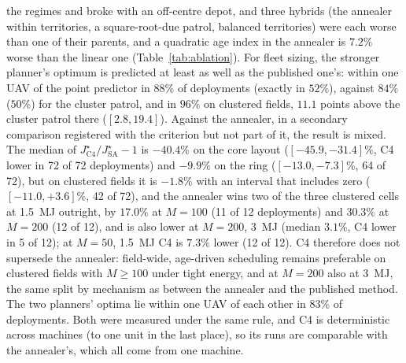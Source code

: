 \documentclass[journal,outdir=./]{IEEEtran}
\begin{document}
the regimes and broke with an off-centre depot, and three hybrids (the annealer within territories, a square-root-due patrol, balanced territories) were each worse than one of their parents, and a quadratic age index in the annealer is $7.2\%$ worse than the linear one (Table~\ref{tab:ablation}). For fleet sizing, the stronger planner's optimum is predicted at least as well as the published one's: within one UAV of the point predictor in $88\%$ of deployments (exactly in $52\%$), against $84\%$ ($50\%$) for the cluster patrol, and in $96\%$ on clustered fields, $11.1$ points above the cluster patrol there ($[2.8,19.4]$). Against the annealer, in a secondary comparison registered with the criterion but not part of it, the result is mixed. The median of $J^{\star}_{\mathrm{C4}}/J^{\star}_{\mathrm{SA}}-1$ is $-40.4\%$ on the core layout ($[-45.9,-31.4]\%$, C4 lower in 72 of 72 deployments) and $-9.9\%$ on the ring ($[-13.0,-7.3]\%$, 64 of 72), but on clustered fields it is $-1.8\%$ with an interval that includes zero ($[-11.0,+3.6]\%$, 42 of 72), and the annealer wins two of the three clustered cells at 1.5~MJ outright, by $17.0\%$ at $M=100$ (11 of 12 deployments) and $30.3\%$ at $M=200$ (12 of 12), and is also lower at $M=200$, 3~MJ (median $3.1\%$, C4 lower in 5 of 12); at $M=50$, 1.5~MJ C4 is $7.3\%$ lower (12 of 12). C4 therefore does not supersede the annealer: field-wide, age-driven scheduling remains preferable on clustered fields with $M\ge100$ under tight energy, and at $M=200$ also at 3~MJ, the same split by mechanism as between the annealer and the published method. The two planners' optima lie within one UAV of each other in $83\%$ of deployments. Both were measured under the same rule, and C4 is deterministic across machines (to one unit in the last place), so its runs are comparable with the annealer's, which all come from one machine.
\end{document}
